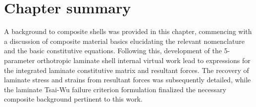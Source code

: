 \section{Chapter summary}
A background to composite shells was provided in this chapter, commencing with a discussion of composite material basics elucidating the relevant nomenclature and the basic constitutive equations. Following this, development of the 5-parameter orthotropic laminate shell internal virtual work lead to expressions for the integrated laminate constitutive matrix and resultant forces. The recovery of laminate stress and strains from resultant forces was subsequently detailed, while the laminate Tsai-Wu failure criterion formulation finalized the necessary composite background pertinent to this work.
